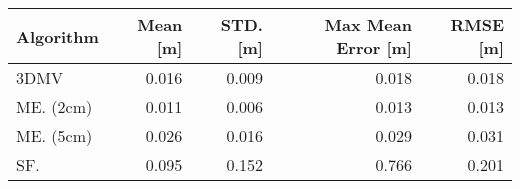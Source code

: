 \begin{tabular}{lrrrr}
\toprule
Algorithm  &  Mean [m] &  STD. [m] &  Max Mean Error [m] &  RMSE [m] \\
\midrule
3DMV              &                      0.016 &     0.009 &               0.018 &     0.018 \\
ME. (2cm) &                      0.011 &     0.006 &               0.013 &     0.013 \\
ME. (5cm) &                      0.026 &     0.016 &               0.029 &     0.031 \\
SF.    &                      0.095 &     0.152 &               0.766 &     0.201 \\
\bottomrule
\end{tabular}
